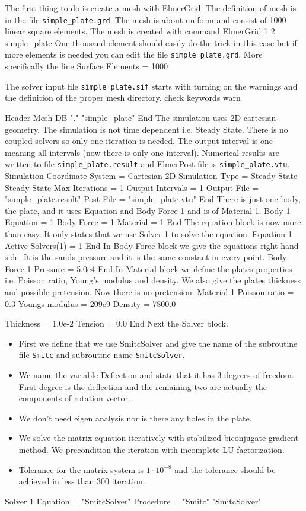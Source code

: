 The first thing to do is create a mesh with ElmerGrid.
The definition of mesh is in the file \texttt{simple\_plate.grd}.
The mesh is about uniform and consist of 1000 linear square elements.
The mesh is created with command
\ttbegin
ElmerGrid 1 2 simple_plate
\ttend
One thousand element should easily do the trick in this case
but if more elements is needed you can edit the file 
\texttt{simple\_plate.grd}.
More specifically the line
\ttbegin
Surface Elements = 1000
\ttend

The solver input file \texttt{simple\_plate.sif} starts with turning on 
the warnings and the definition of the proper mesh directory. 
%
\ttbegin
check keywords warn

Header
  Mesh DB "." "simple_plate"
End
\ttend
The simulation uses 2D cartesian geometry. The simulation is not
time dependent i.e. Steady State. 
There is no coupled solvers so only one iteration is needed. 
The output interval is one meaning all intervals (now there is only one
interval). Numerical results are written to file \texttt{simple\_plate.result}
and ElmerPost file is \texttt{simple\_plate.vtu}.
\ttbegin
Simulation
  Coordinate System = Cartesian 2D
  Simulation Type = Steady State
  Steady State Max Iterations = 1
  Output Intervals = 1
  Output File = "simple_plate.result"
  Post File = "simple_plate.vtu"
End
\ttend
There is just one body, the plate, and it uses Equation and  Body Force 1 and
is of Material 1.
\ttbegin
Body 1
  Equation = 1
  Body Force = 1
  Material = 1
End
\ttend
The equation block is now more than easy. 
It only states that we use Solver 1 to solve the equation.
\ttbegin
Equation 1
  Active Solvers(1) = 1
End
\ttend
In Body Force block we give the equations right hand side. 
It is the sands pressure and it is the same constant in every point.
\ttbegin
Body Force 1
  Pressure = 5.0e4
End
\ttend
In Material block we define the plates properties i.e. Poisson ratio,
Young's modulus and density. We also give the plates thickness and
possible pretension. Now there is no pretension.
\ttbegin
Material 1   
  Poisson ratio = 0.3
  Youngs modulus = 209e9
  Density = 7800.0

  Thickness = 1.0e-2
  Tension = 0.0
End
\ttend
Next the Solver block.
\begin{itemize}
\item First we define that we use SmitcSolver  
and give the name of the subroutine file \texttt{Smitc} and
subroutine name \texttt{SmitcSolver}. 
\item We name the variable Deflection and state that it has 3 degrees of freedom. 
First degree is the deflection and the remaining two are actually 
the components of rotation vector. 
\item We don't need eigen analysis nor is there any holes in the plate. 
\item We solve the matrix equation iteratively with stabilized biconjugate 
gradient method. We precondition the iteration with incomplete 
LU-factorization. 
\item Tolerance for the matrix system is $1\cdot10^{-8}$
and the tolerance should be achieved in less than 300 iteration.
\end{itemize}
\ttbegin
Solver 1
  Equation = "SmitcSolver"
  Procedure = "Smitc" "SmitcSolver"

